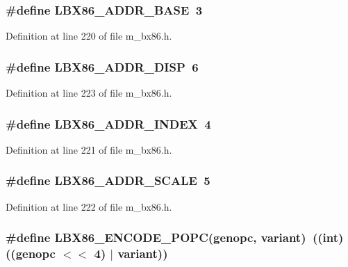 \subsubsection{\setlength{\rightskip}{0pt plus 5cm}\#define LBX86\_\-ADDR\_\-BASE~3}\label{m__bx86_8h_c5ee2f167571345f159c472c0308fe2a}




Definition at line 220 of file m\_\-bx86.h.
\subsubsection{\setlength{\rightskip}{0pt plus 5cm}\#define LBX86\_\-ADDR\_\-DISP~6}\label{m__bx86_8h_3998a5cfb512858e75745a349ff3145b}




Definition at line 223 of file m\_\-bx86.h.
\subsubsection{\setlength{\rightskip}{0pt plus 5cm}\#define LBX86\_\-ADDR\_\-INDEX~4}\label{m__bx86_8h_937d1c920de605c820704687016210c4}




Definition at line 221 of file m\_\-bx86.h.
\subsubsection{\setlength{\rightskip}{0pt plus 5cm}\#define LBX86\_\-ADDR\_\-SCALE~5}\label{m__bx86_8h_7ff88ab16ab8cf06edf2bea8c913ff08}




Definition at line 222 of file m\_\-bx86.h.
\subsubsection{\setlength{\rightskip}{0pt plus 5cm}\#define LBX86\_\-ENCODE\_\-POPC(genopc, variant)~((int)((genopc $<$$<$ 4) $|$ variant))}\label{m__bx86_8h_68a227dd07745b419d3c211965981e9b}




